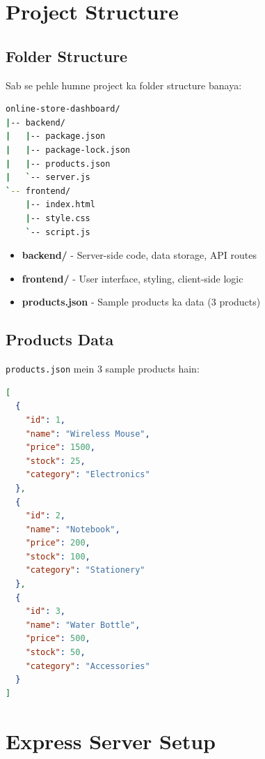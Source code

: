 \documentclass[12pt,a4paper]{article}
\begin{document}
\newpage
\tableofcontents
\newpage

\section{Project Structure}
\label{sec:structure}

\subsection{Folder Structure}
Sab se pehle humne project ka folder structure banaya:

\begin{lstlisting}[language=bash, caption={Project Folder Structure}]
online-store-dashboard/
|-- backend/
|   |-- package.json
|   |-- package-lock.json
|   |-- products.json
|   `-- server.js
`-- frontend/
    |-- index.html
    |-- style.css
    `-- script.js
\end{lstlisting}

\begin{itemize}[leftmargin=2em]
    \item \textbf{backend/} - Server-side code, data storage, API routes
    \item \textbf{frontend/} - User interface, styling, client-side logic
    \item \textbf{products.json} - Sample products ka data (3 products)
\end{itemize}

\subsection{Products Data}
\texttt{products.json} mein 3 sample products hain:

\begin{lstlisting}[language=json, caption={products.json - Sample Data}]
[
  {
    "id": 1,
    "name": "Wireless Mouse",
    "price": 1500,
    "stock": 25,
    "category": "Electronics"
  },
  {
    "id": 2,
    "name": "Notebook",
    "price": 200,
    "stock": 100,
    "category": "Stationery"
  },
  {
    "id": 3,
    "name": "Water Bottle",
    "price": 500,
    "stock": 50,
    "category": "Accessories"
  }
]
\end{lstlisting}

\section{Express Server Setup}
\label{sec:express}
\end{document}
